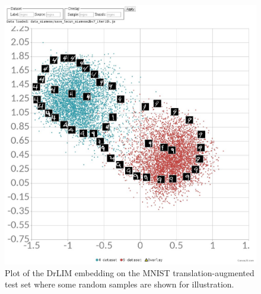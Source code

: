 \documentclass[a4paper,12pt]{report}
\begin{document}
\begin{figure}[t]
    \centering
    \includegraphics{thesis_figures/mnist_cl_drlim.jpg}
    \caption{Plot of the DrLIM embedding on the MNIST translation-augmented test set where some random samples are shown for illustration.}
    \label{fig:mnist_cl_drlim}
\end{figure}
\end{document}
